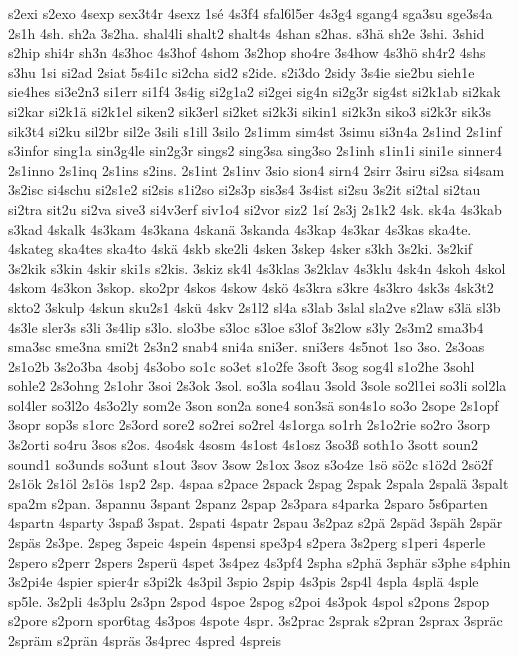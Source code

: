 {s2exi
s2exo
4sexp
sex3t4r
4sexz
1sé
4s3f4
sfal6l5er
4s3g4
sgang4
sga3su
sge3s4a
2s1h
4sh.
sh2a
3s2ha.
shal4li
shalt2
shalt4s
4shan
s2has.
s3hä
sh2e
3shi.
3shid
s2hip
shi4r
sh3n
4s3hoc
4s3hof
4shom
3s2hop
sho4re
3s4how
4s3hö
sh4r2
4shs
s3hu
1si
si2ad
2siat
5s4i1c
si2cha
sid2
s2ide.
s2i3do
2sidy
3s4ie
sie2bu
sieh1e
sie4hes
si3e2n3
si1err
si1f4
3s4ig
si2g1a2
si2gei
sig4n
si2g3r
sig4st
si2k1ab
si2kak
si2kar
si2k1ä
si2k1el
siken2
sik3erl
si2ket
si2k3i
sikin1
si2k3n
siko3
si2k3r
sik3s
sik3t4
si2ku
sil2br
sil2e
3sili
s1ill
3silo
2s1imm
sim4st
3simu
si3n4a
2s1ind
2s1inf
s3infor
sing1a
sin3g4le
sin2g3r
sings2
sing3sa
sing3so
2s1inh
s1in1i
sini1e
sinner4
2s1inno
2s1inq
2s1ins
s2ins.
2s1int
2s1inv
3sio
sion4
sirn4
2sirr
3siru
si2sa
si4sam
3s2isc
si4schu
si2s1e2
si2sis
s1i2so
si2s3p
sis3s4
3s4ist
si2su
3s2it
si2tal
si2tau
si2tra
sit2u
si2va
sive3
si4v3erf
siv1o4
si2vor
siz2
1sí
2s3j
2s1k2
4sk.
sk4a
4s3kab
s3kad
4skalk
4s3kam
4s3kana
4skanä
3skanda
4s3kap
4s3kar
4s3kas
ska4te.
4skateg
ska4tes
ska4to
4skä
4skb
ske2li
4sken
3skep
4sker
s3kh
3s2ki.
3s2kif
3s2kik
s3kin
4skir
ski1s
s2kis.
3skiz
sk4l
4s3klas
3s2klav
4s3klu
4sk4n
4skoh
4skol
4skom
4s3kon
3skop.
sko2pr
4skos
4skow
4skö
4s3kra
s3kre
4s3kro
4sk3s
4sk3t2
skto2
3skulp
4skun
sku2s1
4skü
4skv
2s1l2
sl4a
s3lab
3slal
sla2ve
s2law
s3lä
sl3b
4s3le
sler3s
s3li
3s4lip
s3lo.
slo3be
s3loc
s3loe
s3lof
3s2low
s3ly
2s3m2
sma3b4
sma3sc
sme3na
smi2t
2s3n2
snab4
sni4a
sni3er.
sni3ers
4s5not
1so
3so.
2s3oas
2s1o2b
3s2o3ba
4sobj
4s3obo
so1c
so3et
s1o2fe
3soft
3sog
sog4l
s1o2he
3sohl
sohle2
2s3ohng
2s1ohr
3soi
2s3ok
3sol.
so3la
so4lau
3sold
3sole
so2l1ei
so3li
sol2la
sol4ler
so3l2o
4s3o2ly
som2e
3son
son2a
sone4
son3sä
son4s1o
so3o
2sope
2s1opf
3sopr
sop3s
s1orc
2s3ord
sore2
so2rei
so2rel
4s1orga
so1rh
2s1o2rie
so2ro
3sorp
3s2orti
so4ru
3sos
s2os.
4so4sk
4sosm
4s1ost
4s1osz
3so3ß
soth1o
3sott
soun2
sound1
so3unds
so3unt
s1out
3sov
3sow
2s1ox
3soz
s3o4ze
1sö
sö2c
s1ö2d
2sö2f
2s1ök
2s1öl
2s1ös
1sp2
2sp.
4spaa
s2pace
2spack
2spag
2spak
2spala
2spalä
3spalt
spa2m
s2pan.
3spannu
3spant
2spanz
2spap
2s3para
s4parka
2sparo
5s6parten
4spartn
4sparty
3spaß
3spat.
2spati
4spatr
2spau
3s2paz
s2pä
2späd
3späh
2spär
2späs
2s3pe.
2speg
3speic
4spein
4spensi
spe3p4
s2pera
3s2perg
s1peri
4sperle
2spero
s2perr
2spers
2sperü
4spet
3s4pez
4s3pf4
2spha
s2phä
3sphär
s3phe
s4phin
3s2pi4e
4spier
spier4r
s3pi2k
4s3pil
3spio
2spip
4s3pis
2sp4l
4spla
4splä
4sple
sp5le.
3s2pli
4s3plu
2s3pn
2spod
4spoe
2spog
s2poi
4s3pok
4spol
s2pons
2spop
s2pore
s2porn
spor6tag
4s3pos
4spote
4spr.
3s2prac
2sprak
s2pran
2sprax
3spräc
2spräm
s2prän
4spräs
3s4prec
4spred
4spreis
}
